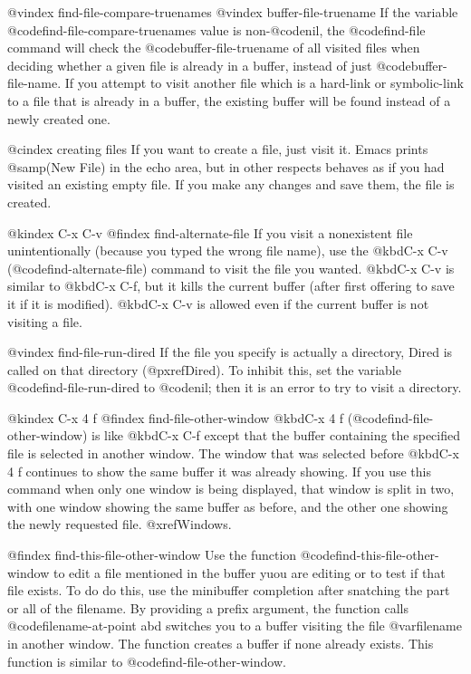 {{{{{{{{{{{{{{{{@vindex find-file-compare-truenames
@vindex buffer-file-truename
If the variable @code{find-file-compare-truenames} value is
non-@code{nil}, the @code{find-file} command will check the
@code{buffer-file-truename} of all visited files when deciding whether a
given file is already in a buffer, instead of just
@code{buffer-file-name}.  If you attempt to visit another file which is
a hard-link or symbolic-link to a file that is already in a buffer, the
existing buffer will be found instead of a newly created one.

@cindex creating files
   If you want to create a file, just visit it.  Emacs prints
@samp{(New File)} in the echo area, but in other respects behaves as if you
had visited an existing empty file.  If you make any changes and save them,
the file is created.

@kindex C-x C-v
@findex find-alternate-file
  If you visit a nonexistent file unintentionally (because you typed the
wrong file name), use the @kbd{C-x C-v} (@code{find-alternate-file})
command to visit the file you wanted.  @kbd{C-x C-v} is similar to @kbd{C-x
C-f}, but it kills the current buffer (after first offering to save it if
it is modified).  @kbd{C-x C-v} is allowed even if the current buffer
is not visiting a file.

@vindex find-file-run-dired
  If the file you specify is actually a directory, Dired is called on
that directory (@pxref{Dired}).  To inhibit this, set the variable
@code{find-file-run-dired} to @code{nil}; then it is an error to try to
visit a directory.

@kindex C-x 4 f
@findex find-file-other-window
  @kbd{C-x 4 f} (@code{find-file-other-window}) is like @kbd{C-x C-f}
except that the buffer containing the specified file is selected in another
window.  The window that was selected before @kbd{C-x 4 f} continues to
show the same buffer it was already showing.  If you use this command when
only one window is being displayed, that window is split in two, with one
window showing the same buffer as before, and the other one showing the
newly requested file.  @xref{Windows}.

@findex find-this-file-other-window
 Use the function @code{find-this-file-other-window} to edit a file
mentioned in the buffer yuou are editing or to test if that file exists.
To do do this, use the minibuffer completion after snatching the part or
all of the filename. By providing a prefix argument, the function calls
@code{filename-at-point} abd switches you to a buffer visiting the file
@var{filename} in another window. The function creates a buffer if none
already exists. This function is similar to @code{find-file-other-window}.

}}}}}}}}}}}}}}}}
